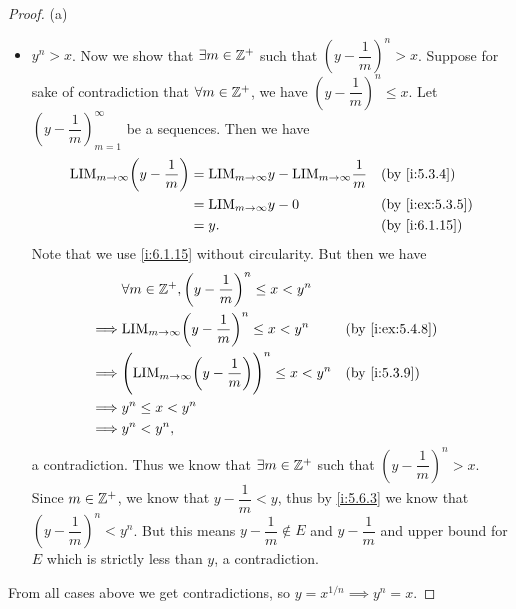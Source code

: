 \begin{proof}{(a)}
\begin{itemize}
          But this means \(y + \dfrac{1}{m} \in E\) and \(y + \dfrac{1}{m} \leq y\), a contradiction.
    \item \(y^n > x\).
          Now we show that \(\exists m \in \mathbb{Z}^+\) such that \((y - \dfrac{1}{m})^n > x\).
          Suppose for sake of contradiction that \(\forall m \in \mathbb{Z}^+\), we have \((y - \dfrac{1}{m})^n \leq x\).
          Let \((y - \dfrac{1}{m})_{m = 1}^\infty\) be a sequences.
          Then we have
          \begin{align*}
            \text{LIM}_{m \to \infty} \bigg(y - \dfrac{1}{m}\bigg) & = \text{LIM}_{m \to \infty} y - \text{LIM}_{m \to \infty} \dfrac{1}{m} &  & \by{i:5.3.4}    \\
                                                                   & = \text{LIM}_{m \to \infty} y - 0                                      &  & \by{i:ex:5.3.5} \\
                                                                   & = y.                                                                   &  & \by{i:6.1.15}
          \end{align*}
          Note that we use \cref{i:6.1.15} without circularity.
          But then we have
          \begin{align*}
                     & \forall m \in \Z^+, \bigg(y - \dfrac{1}{m}\bigg)^n \leq x < y^n                                        \\
            \implies & \text{LIM}_{m \to \infty} \bigg(y - \dfrac{1}{m}\bigg)^n \leq x < y^n             &  & \by{i:ex:5.4.8} \\
            \implies & \Bigg(\text{LIM}_{m \to \infty} \bigg(y - \dfrac{1}{m}\bigg)\Bigg)^n \leq x < y^n &  & \by{i:5.3.9}    \\
            \implies & y^n \leq x < y^n                                                                                       \\
            \implies & y^n < y^n,
          \end{align*}
          a contradiction.
          Thus we know that \(\exists m \in \mathbb{Z}^+\) such that \((y - \dfrac{1}{m})^n > x\).
          Since \(m \in \mathbb{Z}^+\), we know that \(y - \dfrac{1}{m} < y\), thus by \cref{i:5.6.3} we know that \((y - \dfrac{1}{m})^n < y^n\).
          But this means \(y - \dfrac{1}{m} \notin E\) and \(y - \dfrac{1}{m}\) and upper bound for \(E\) which is strictly less than \(y\), a contradiction.
  \end{itemize}
  From all cases above we get contradictions, so \(y = x^{1 / n} \implies y^n = x\).
\end{proof}

